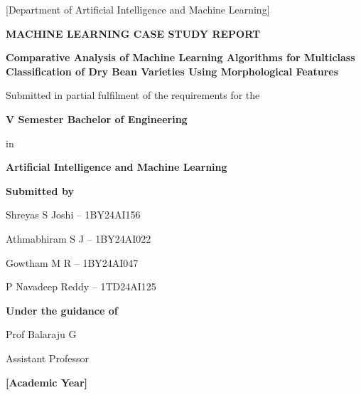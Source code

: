 
\begin{titlepage}
\centering
\vspace*{0.6cm}

{\bfseries\fontsize{15}{19}\par}
\vspace{0.2cm}
{\normalsize [Department of Artificial Intelligence and Machine Learning]\par}

\vspace{2.2cm}
{\bfseries\fontsize{14}{17}\selectfont MACHINE LEARNING CASE STUDY REPORT\par}

\vspace{1.2cm}
{\bfseries\fontsize{17}{21}\selectfont
Comparative Analysis of Machine Learning Algorithms for Multiclass
Classification of Dry Bean Varieties Using Morphological Features\par}

\vspace{1.6cm}
{\normalsize Submitted in partial fulfilment of the requirements for the\par}
\vspace{0.25cm}
{\bfseries\fontsize{13}{16}\selectfont V Semester Bachelor of Engineering\par}
\vspace{0.15cm}
{\normalsize in\par}
\vspace{0.15cm}
{\bfseries\fontsize{13}{16}\selectfont Artificial Intelligence and Machine
Learning\par}

\vspace{1.4cm}
{\bfseries\normalsize Submitted by\par}
\vspace{0.25cm}
{\normalsize
Shreyas S Joshi -- 1BY24AI156\par
\vspace{0.1cm}
Athmabhiram S J -- 1BY24AI022\par
\vspace{0.1cm}
Gowtham M R -- 1BY24AI047\par
\vspace{0.1cm}
P Navadeep Reddy -- 1TD24AI125\par}

\vspace{1.4cm}
{\bfseries\normalsize Under the guidance of\par}
\vspace{0.25cm}
{\normalsize Prof Balaraju G\par}
\vspace{0.1cm}
{\normalsize Assistant Professor\par}

\vfill
{\bfseries\normalsize [Academic Year]\par}
\end{titlepage}

